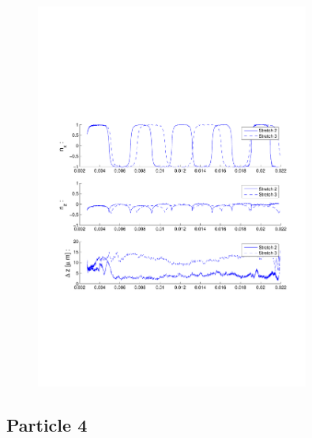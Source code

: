 \begin{figure}[H]

\centering

\includegraphics[width=0.8\textwidth]{Images/Particle 1/Stretch2.pdf}

\end{figure}

\subsection{Particle 4}

